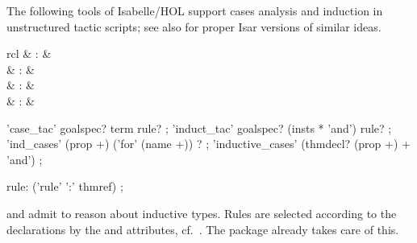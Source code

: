\begin{isabellebody}
\begin{isamarkuptext}
\begin{description}
  \end{description}%
\end{isamarkuptext}%
\isamarkuptrue%
%
\isamarkuptrue%
%
\begin{isamarkuptext}%
The following tools of Isabelle/HOL support cases analysis and
  induction in unstructured tactic scripts; see also
   for proper Isar versions of similar ideas.

  \begin{matharray}{rcl}
    \hypertarget{method.HOL.case-tac}{\hyperlink{method.HOL.case-tac}{\mbox{}}}\isa{{\isachardoublequote}\isactrlsup {\isacharasterisk}{\isachardoublequote}} & : &  \\
    \hypertarget{method.HOL.induct-tac}{\hyperlink{method.HOL.induct-tac}{\mbox{}}}\isa{{\isachardoublequote}\isactrlsup {\isacharasterisk}{\isachardoublequote}} & : &  \\
    \hypertarget{method.HOL.ind-cases}{\hyperlink{method.HOL.ind-cases}{\mbox{}}}\isa{{\isachardoublequote}\isactrlsup {\isacharasterisk}{\isachardoublequote}} & : &  \\
    \hypertarget{command.HOL.inductive-cases}{\hyperlink{command.HOL.inductive-cases}{\mbox{}}}\isa{{\isachardoublequote}\isactrlsup {\isacharasterisk}{\isachardoublequote}} & : &  \\
  \end{matharray}

  \begin{rail}
    'case\_tac' goalspec? term rule?
    ;
    'induct\_tac' goalspec? (insts * 'and') rule?
    ;
    'ind\_cases' (prop +) ('for' (name +)) ?
    ;
    'inductive\_cases' (thmdecl? (prop +) + 'and')
    ;

    rule: ('rule' ':' thmref)
    ;
  \end{rail}

  \begin{description}

  \item \hyperlink{method.HOL.case-tac}{\mbox{}} and \hyperlink{method.HOL.induct-tac}{\mbox{}} admit
  to reason about inductive types.  Rules are selected according to
  the declarations by the \hyperlink{attribute.cases}{\mbox{}} and \hyperlink{attribute.induct}{\mbox{}}
  attributes, cf.\ .  The \hyperlink{command.HOL.datatype}{\mbox{}} package already takes care of this.


\end{description}
\end{isamarkuptext}
\end{isabellebody}
